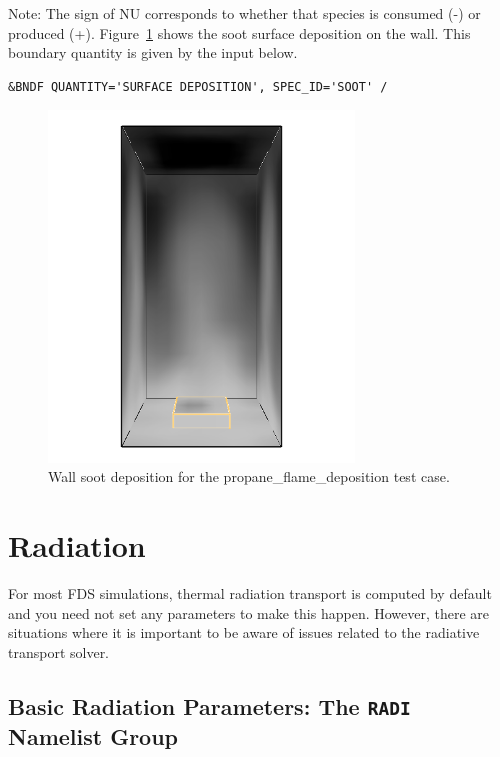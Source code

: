 \documentclass[11pt]{book}
\begin{document}
\noindent
Note: The sign of {\ct NU} corresponds to whether that species is consumed (-) or produced (+). Figure~\ref{soot_deposition} shows the soot surface deposition on the wall.  This boundary quantity is given by the input below.

\begin{lstlisting}
&BNDF QUANTITY='SURFACE DEPOSITION', SPEC_ID='SOOT' /
\end{lstlisting}

\begin{figure}[ht]
\centering
\includegraphics[width=3.2in]{SCRIPT_FIGURES/propane_flame_deposition}
\caption[Wall soot deposition for the {\ct propane\_flame\_deposition} test case]{Wall soot deposition for the {\ct propane\_flame\_deposition} test case.}
\label{soot_deposition}
\end{figure}













\chapter{Radiation}

For most FDS simulations, thermal radiation transport is computed by default and you need not set any
parameters to make this happen. However, there are situations where it is important to be aware of
issues related to the radiative transport solver.

\section{Basic Radiation Parameters: The \texorpdfstring{{\tt RADI}}{RADI} Namelist Group}
\label{info:RADI}
\end{document}
